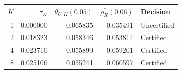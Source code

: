 \begin{tabular}{rrrrl}\toprule $K$ & $\tau_K$ & $\theta_{U,K}(0.05)$ & $\rho_K^*(0.06)$ & Decision\\\midrule
1 & 0.000000 & 0.065835 & 0.035491 & Uncertified\\
2 & 0.018323 & 0.058346 & 0.053814 & Certified\\
4 & 0.023710 & 0.055899 & 0.059201 & Certified\\
8 & 0.025106 & 0.055241 & 0.060597 & Certified\\\bottomrule\end{tabular}
